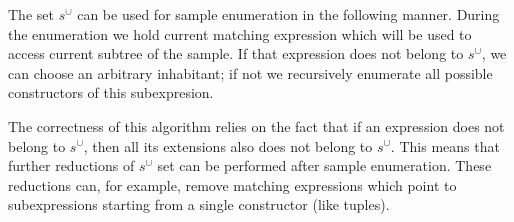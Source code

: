 The set $s^\cup$ can be used for sample enumeration in the following manner. During the enumeration we hold current matching expression which will be used to
access current subtree of the sample. If that expression does not belong to $s^\cup$, we can choose an arbitrary inhabitant; if not we recursively
enumerate all possible constructors of this subexpresion.

The correctness of this algorithm relies on the fact that if an expression does not belong to $s^\cup$, then all its extensions also does not belong to $s^\cup$.
This means that further reductions of $s^\cup$ set can be performed after sample enumeration. These reductions can, for example, remove matching expressions which
point to subexpressions starting from a single constructor (like tuples).

